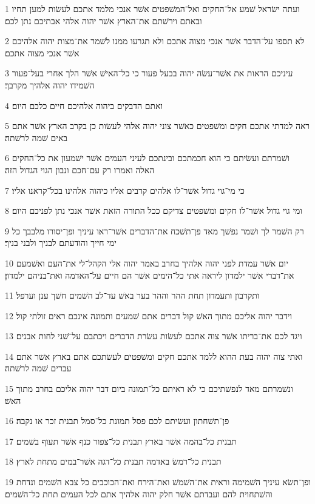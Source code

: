 \par 1 ועתה ישׂראל שׁמע אל־החקים ואל־המשׁפטים אשׁר אנכי מלמד אתכם לעשׂות למען תחיו ובאתם וירשׁתם את־הארץ אשׁר יהוה אלהי אבתיכם נתן לכם׃
\par 2 לא תספו על־הדבר אשׁר אנכי מצוה אתכם ולא תגרעו ממנו לשׁמר את־מצות יהוה אלהיכם אשׁר אנכי מצוה אתכם׃
\par 3 עיניכם הראות את אשׁר־עשׂה יהוה בבעל פעור כי כל־האישׁ אשׁר הלך אחרי בעל־פעור השׁמידו יהוה אלהיך מקרבך׃
\par 4 ואתם הדבקים ביהוה אלהיכם חיים כלכם היום׃
\par 5 ראה למדתי אתכם חקים ומשׁפטים כאשׁר צוני יהוה אלהי לעשׂות כן בקרב הארץ אשׁר אתם באים שׁמה לרשׁתה׃
\par 6 ושׁמרתם ועשׂיתם כי הוא חכמתכם ובינתכם לעיני העמים אשׁר ישׁמעון את כל־החקים האלה ואמרו רק עם־חכם ונבון הגוי הגדול הזה׃
\par 7 כי מי־גוי גדול אשׁר־לו אלהים קרבים אליו כיהוה אלהינו בכל־קראנו אליו׃
\par 8 ומי גוי גדול אשׁר־לו חקים ומשׁפטים צדיקם ככל התורה הזאת אשׁר אנכי נתן לפניכם היום׃
\par 9 רק השׁמר לך ושׁמר נפשׁך מאד פן־תשׁכח את־הדברים אשׁר־ראו עיניך ופן־יסורו מלבבך כל ימי חייך והודעתם לבניך ולבני בניך׃
\par 10 יום אשׁר עמדת לפני יהוה אלהיך בחרב באמר יהוה אלי הקהל־לי את־העם ואשׁמעם את־דברי אשׁר ילמדון ליראה אתי כל־הימים אשׁר הם חיים על־האדמה ואת־בניהם ילמדון׃
\par 11 ותקרבון ותעמדון תחת ההר וההר בער באשׁ עד־לב השׁמים חשׁך ענן וערפל׃
\par 12 וידבר יהוה אליכם מתוך האשׁ קול דברים אתם שׁמעים ותמונה אינכם ראים זולתי קול׃
\par 13 ויגד לכם את־בריתו אשׁר צוה אתכם לעשׂות עשׂרת הדברים ויכתבם על־שׁני לחות אבנים׃
\par 14 ואתי צוה יהוה בעת ההוא ללמד אתכם חקים ומשׁפטים לעשׂתכם אתם בארץ אשׁר אתם עברים שׁמה לרשׁתה׃
\par 15 ונשׁמרתם מאד לנפשׁתיכם כי לא ראיתם כל־תמונה ביום דבר יהוה אליכם בחרב מתוך האשׁ׃
\par 16 פן־תשׁחתון ועשׂיתם לכם פסל תמונת כל־סמל תבנית זכר או נקבה׃
\par 17 תבנית כל־בהמה אשׁר בארץ תבנית כל־צפור כנף אשׁר תעוף בשׁמים׃
\par 18 תבנית כל־רמשׂ באדמה תבנית כל־דגה אשׁר־במים מתחת לארץ׃
\par 19 ופן־תשׂא עיניך השׁמימה וראית את־השׁמשׁ ואת־הירח ואת־הכוכבים כל צבא השׁמים ונדחת והשׁתחוית להם ועבדתם אשׁר חלק יהוה אלהיך אתם לכל העמים תחת כל־השׁמים׃

